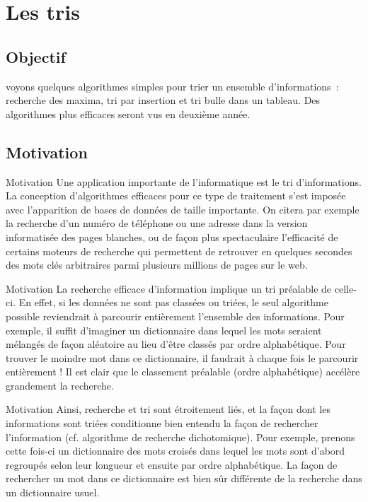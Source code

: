 \section{Les tris}

\subsection{Objectif}

\begin{frame}
	voyons quelques algorithmes simples pour trier un
		ensemble d'informations~: recherche des maxima, tri
		par insertion et tri bulle dans un tableau. 
		Des algorithmes plus efficaces seront vus
		en deuxième année.
\end{frame}

\subsection{Motivation}

\begin{frame}{Motivation}
	Une application importante de l’informatique est le tri d’informations.
	La conception d’algorithmes efficaces pour ce type de traitement s’est
	imposée avec l’apparition de bases de données de taille importante. On
	citera par exemple la recherche d’un numéro de téléphone ou une adresse
	dans la version informatisée des pages blanches, ou de façon plus
	spectaculaire l’efficacité de certains moteurs de recherche qui
	permettent de retrouver en quelques secondes des mots clés arbitraires
	parmi plusieurs millions de pages sur le web.
\end{frame}

\begin{frame}{Motivation}
La recherche efficace d’information implique un tri préalable de
	celle-ci. En effet, si les données ne sont pas classées ou triées, le
	seul algorithme possible reviendrait à parcourir entièrement l’ensemble
	des informations. Pour exemple, il suffit d’imaginer un dictionnaire
	dans lequel les mots seraient mélangés de façon aléatoire au lieu
	d’être classés par ordre alphabétique. Pour trouver le moindre mot dans
	ce dictionnaire, il faudrait à chaque fois le parcourir entièrement !
	Il est clair que le classement préalable (ordre alphabétique) accélère
	grandement la recherche.
\end{frame}

\begin{frame}{Motivation}
	Ainsi, recherche et tri sont étroitement liés, et la façon dont les
	informations sont triées conditionne bien entendu la façon de
	rechercher l’information (cf. algorithme de recherche dichotomique).
	Pour exemple, prenons cette fois-ci un dictionnaire des mots croisés
	dans lequel les mots sont d’abord regroupés selon leur longueur et
	ensuite par ordre alphabétique. La façon de rechercher un mot dans ce
	dictionnaire est bien sûr différente de la recherche dans un
	dictionnaire usuel. 
\end{frame}

